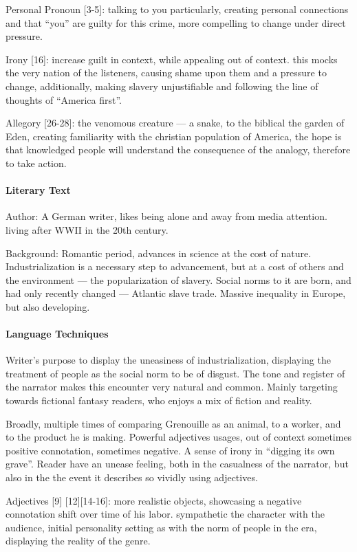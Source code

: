 \documentclass[a4paper,12pt]{article}
\begin{document}
Personal Pronoun [3-5]: talking to you particularly, creating personal connections and that ``you'' are guilty for this crime, more compelling to change under direct pressure.

Irony [16]: increase guilt in context, while appealing out of context. this mocks the very nation of the listeners, causing shame upon them and a pressure to change, additionally, making slavery unjustifiable and following the line of thoughts of ``America first''.

Allegory [26-28]: the venomous creature --- a snake, to the biblical the garden of Eden, creating familiarity with the christian population of America, the hope is that knowledged people will understand the consequence of the analogy, therefore to take action.

\paragraph{Literary Text} Author: A German writer, likes being alone and away from media attention. living after WWII in the 20th century.

Background: Romantic period, advances in science at the cost of nature. Industrialization is a necessary step to advancement, but at a cost of others and the environment --- the popularization of slavery. Social norms to it are born, and had only recently changed --- Atlantic slave trade. Massive inequality in Europe, but also developing.

\paragraph{Language Techniques}
Writer's purpose to display the uneasiness of industrialization, displaying the treatment of people as the social norm to be of disgust. The tone and register of the narrator makes this encounter very natural and common. Mainly targeting towards fictional fantasy readers, who enjoys a mix of fiction and reality.

Broadly, multiple times of comparing Grenouille as an animal, to a worker, and to the product he is making. Powerful adjectives usages, out of context sometimes positive connotation, sometimes negative. A sense of irony in ``digging its own grave''. Reader have an unease feeling, both in the casualness of the narrator, but also in the the event it describes so vividly using adjectives.

Adjectives [9] [12][14-16]: more realistic objects, showcasing a negative connotation shift over time of his labor. sympathetic the character with the audience, initial personality setting as with the norm of people in the era, displaying the reality of the genre.
\end{document}
